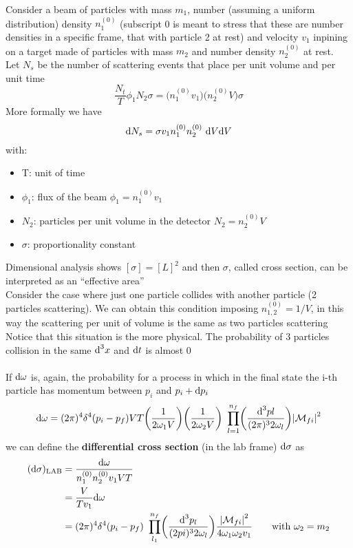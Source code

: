 \documentclass[TheoreticalPhy_ModB.tex]{subfiles}
\begin{document}
Consider a beam of particles with mass $m_1$, number (assuming a uniform distribution) density $n_1^{(0)}$ (subscript 0 is meant to stress that these are number densities in a specific frame, that with particle 2 at rest) and velocity $v_1$ inpining on a target made of particles with mass $m_2$ and number density $n_2^{(0)}$ at rest.\\
Let $N_s$ be the number of scattering events that place per unit volume and per unit time
\[
\frac{N_t}{T} \phi_1 N_2 \sigma = \bigl( n_1^{(0)} v_1 \bigr) \bigl( n_2^{(0)} V \bigr) \sigma
\]
More formally we have
\[
\textup{d} N_s = \sigma v_1 n_1^{(0)} n_2^{(0)} \ \textup{d} V \textup{d} V
\]
with:
\begin{itemize}[label=$\bullet$]
\item T: unit of time
\item $\phi_1$: flux of the beam $\phi_1 = n_1^{(0)} v_1$
\item $N_2$: particles per unit volume in the detector $N_2 = n_2^{(0)}V$
\item $\sigma$: proportionality constant
\end{itemize}
Dimensional analysis shows $[\sigma] = [L]^2$ and then $\sigma$, called cross section, can be interpreted as an ``effective area''\\
Consider the case where just one particle collides with another particle (2 particles scattering). We can obtain this condition imposing $n_{1,2}^{(0)} = 1/V$, in this way the scattering per unit of volume is the same as two particles scattering\\
Notice that this situation is the more physical. The probability of 3 particles collision in the same $\textup{d}^3 x$ and $\textup{d} t$ is almost 0\\ \\
If $\textup{d} \omega$ is, again, the probability for a process in which in the final state the i-th particle has momentum between $p_i$ and $p_i + \textup{d} p_i$
\[
\textup{d} \omega = (2 \pi)^4 \delta^4 (p_i - p_f) VT \biggl( \frac{1}{2 \omega_1 V} \biggl) \biggl( \frac{1}{2 \omega_2 V} \biggr) \
	\prod_{l=1}^{n_f} \biggl( \frac{\textup{d}^3 pl}{(2 \pi)^3 2 \omega_l} \biggr) \abs{\mathcal{M}_{fi}}^2
\]
we can define the \textbf{differential cross section} (in the lab frame) \textbf{$\textup{d} \sigma$} as
\[
\begin{split}
(\textup{d} \sigma)_{\textup{LAB}}	& = \frac{\textup{d} \omega}{n_1^{(0)} n_2^{(0)} v_1 VT}	\\
						& =\frac{V}{T v_1} \textup{d} \omega \\
						& = (2 \pi)^4 \delta^4 (p_i - p_f) \
						\prod_{l_1}^{n_f} \biggl( \frac{\textup{d}^3 p_l}{(2 pi)^3 2 \omega_l} \biggr)
						\frac{\abs{\mathcal{M}_{fi}}^2}{4 \omega_1 \omega_2 v_1}
						\qquad \textup{with } \omega_2 = m_2
\end{split}
\]
\end{document}
